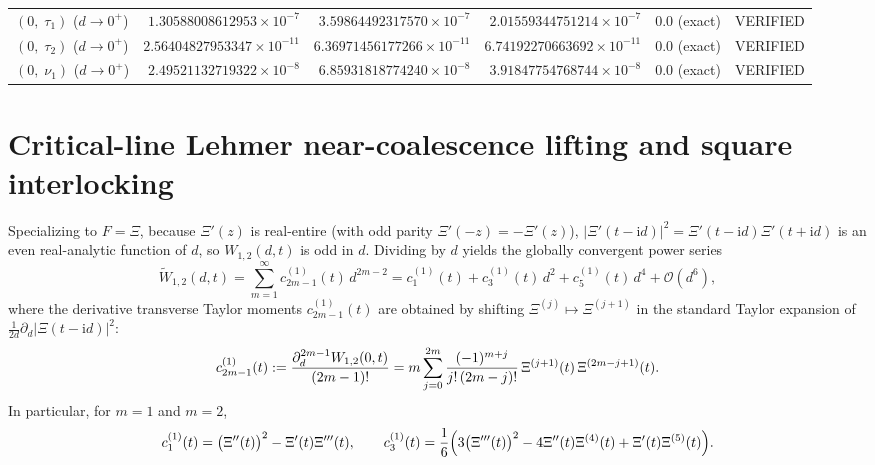 \documentclass[11pt,reqno]{amsart}
\theoremstyle{definition}
\theoremstyle{remark}
\numberwithin{equation}{section}
\newcommand{\ii}{\mathrm{i}}
\newcommand{\fac}{\mathclose{\mathchar"0021}}
\begin{document}
\begin{table}[t]
\begin{tabular}{@{}lrrrrc@{}}
$(0,\; \tau_1)$ ($d\to 0^+$)   & $1.30588008612953\times 10^{-7}$  & $3.59864492317570\times 10^{-7}$  & $2.01559344751214\times 10^{-7}$  & $0.0$ (exact) & VERIFIED \\
$(0,\; \tau_2)$ ($d\to 0^+$)   & $2.56404827953347\times 10^{-11}$ & $6.36971456177266\times 10^{-11}$ & $6.74192270663692\times 10^{-11}$ & $0.0$ (exact) & VERIFIED \\
$(0,\; \nu_1)$ ($d\to 0^+$)    & $2.49521132719322\times 10^{-8}$  & $6.85931818774240\times 10^{-8}$  & $3.91847754768744\times 10^{-8}$  & $0.0$ (exact) & VERIFIED \\
\bottomrule
\end{tabular}
\end{table}

\section{Critical-line Lehmer near-coalescence lifting and square interlocking}\label{sec:lehmer_lifting}

Specializing to $F = \Xi$, because $\Xi'(z)$ is real-entire (with odd parity $\Xi'(-z) = -\Xi'(z)$), $|\Xi'(t-\ii d)|^2 = \Xi'(t-\ii d)\Xi'(t+\ii d)$ is an even real-analytic function of $d$, so $W_{1,2}(d,t)$ is odd in $d$. Dividing by $d$ yields the globally convergent power series
\begin{equation}\label{eq:W12_power_series}
\widetilde{W}_{1,2}(d,t) = \sum_{m=1}^{\infty} c_{2m-1}^{(1)}(t)\,d^{2m-2} = c_1^{(1)}(t) + c_3^{(1)}(t)\,d^2 + c_5^{(1)}(t)\,d^4 + \mathcal{O}(d^6),
\end{equation}
where the derivative transverse Taylor moments $c_{2m-1}^{(1)}(t)$ are obtained by shifting $\Xi^{(j)} \mapsto \Xi^{(j+1)}$ in the standard Taylor expansion of $\frac{1}{2d}\partial_d|\Xi(t-\ii d)|^2$:
\begin{equation}\label{eq:c2m1_shift1_def}
c_{2m-1}^{(1)}(t) := \frac{\partial_d^{2m-1}W_{1,2}(0,t)}{(2m-1)\fac} = m\sum_{j=0}^{2m} \frac{(-1)^{m+j}}{j\fac\,(2m-j)\fac}\,\Xi^{(j+1)}(t)\,\Xi^{(2m-j+1)}(t).
\end{equation}
In particular, for $m = 1$ and $m = 2$,
\begin{equation}\label{eq:c1_1_c3_1_explicit}
c_1^{(1)}(t) = \bigl(\Xi''(t)\bigr)^2 - \Xi'(t)\Xi'''(t), \qquad c_3^{(1)}(t) = \frac{1}{6}\Bigl(3\bigl(\Xi'''(t)\bigr)^2 - 4\Xi''(t)\Xi^{(4)}(t) + \Xi'(t)\Xi^{(5)}(t)\Bigr).
\end{equation}
\end{document}
